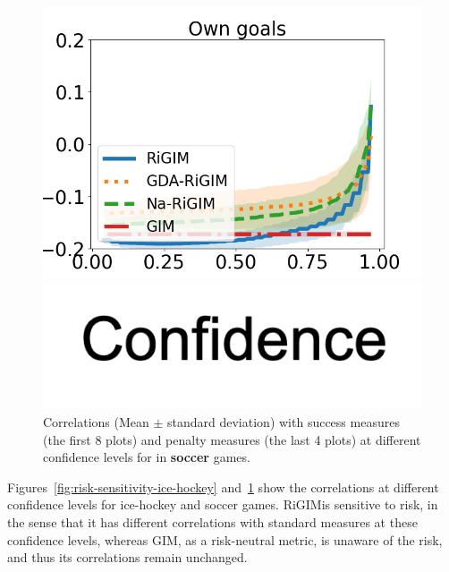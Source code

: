 \documentclass[letterpaper]{article} %
\newcommand{\sys}{RiGIM}
\newcommand{\system}{\sys\;}
\begin{document}
\begin{figure}[htbp]
\begin{minipage}{0.16\textwidth}
    \includegraphics[scale=0.16]{figures/soccer_risk_curve_OwnG_shadow.png}\par
    \vspace{-0.05in}
    \includegraphics[scale=0.12]{figures/confidence_x_label.png}
    \end{minipage}
    \vspace{-0.1in}
    \caption{Correlations (Mean $\pm$ standard deviation) with success measures (the first 8 plots) and penalty measures (the last 4 plots) at different confidence levels for in {\bf soccer} games.}\label{fig:risk-sensitivity-soccer}
    \vspace{-0.2in}
\end{figure}
Figures~\ref{fig:risk-sensitivity-ice-hockey} and~\ref{fig:risk-sensitivity-soccer} show the correlations at different confidence levels for ice-hockey and soccer games. \system is sensitive to risk, in the sense that it has different correlations with standard measures at these confidence levels, whereas GIM, as a risk-neutral metric, is unaware of the risk, and thus its correlations remain unchanged. 
\end{document}
